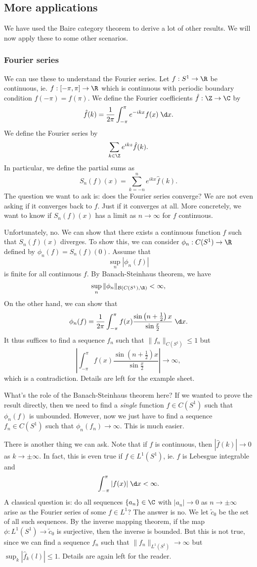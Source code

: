 \documentclass[a4paper]{article}
\begin{document}
\subsection{More applications}
We have used the Baire category theorem to derive a lot of other results. We will now apply these to some other scenarios.

\subsubsection*{Fourier series}
We can use these to understand the Fourier series. Let $f: S^1 \to \R$ be continuous, ie. $f: [-\pi, \pi] \to \R$ which is continuous with periodic boundary condition $f(-\pi) = f(\pi)$. We define the Fourier coefficients $\hat{f}: \Z \to \C$ by
\[
  \hat{f}(k) = \frac{1}{2\pi} \int_{-\pi}^\pi e^{-ikx}f(x)\;\d x.
\]
We define the Fourier series by
\[
  \sum_{k \in \Z} e^{ikz}\hat{f}(k).
\]
In particular, we define the partial sums as
\[
  S_n(f)(x) = \sum_{k = -n}^n e^{ikx}\hat{f}(k).
\]
The question we want to ask is: does the Fourier series converge? We are not even asking if it converges back to $f$. Just if it converges at all. More concretely, we want to know if $S_n(f)(x)$ has a limit as $n \to \infty$ for $f$ continuous.

Unfortunately, no. We can show that there exists a continuous function $f$ such that $S_n(f)(x)$ diverges. To show this, we can consider $\phi_n: C(S^1) \to \R$ defined by $\phi_n (f) = S_n(f)(0)$. Assume that
\[
  \sup_n |\phi_n (f)|
\]
is finite for all continuous $f$. By Banach-Steinhaus theorem, we have
\[
  \sup_n \|\phi_n\|_{\mathcal{B}(C(S^1), \R)} < \infty,
\]
On the other hand, we can show that
\[
  \phi_n(f) = \frac{1}{2\pi}\int_{-\pi}^\pi f(x)\frac{\sin\left(n + \frac{1}{2}\right)x}{\sin \frac{x}{2}} \;\d x.
\]
It thus suffices to find a sequence $f_n$ such that $\|f_n\|_{C(S^1)} \leq 1$ but
\[
  \left|\int_{-\pi}^\pi f(x)\frac{\sin\left(n + \frac{1}{2}\right)x}{\sin \frac{x}{2}}\right|\to \infty,
\]
which is a contradiction. Details are left for the example sheet.

What's the role of the Banach-Steinhaus theorem here? If we wanted to prove the result directly, then we need to find a \emph{single} function $f\in C(S^1)$ such that $\phi_n(f)$ is unbounded. However, now we just have to find a sequence $f_n \in C(S^1)$ such that $\phi_n(f_n) \to \infty$. This is much easier.

There is another thing we can ask. Note that if $f$ is continuous, then $|\hat{f}(k)| \to 0$ as $k \to \pm\infty$. In fact, this is even true if $f \in L^1(S^1)$, ie. $f$ is Lebesgue integrable and
\[
  \int_{-\pi}^\pi |f(x)| \;\d x < \infty.
\]
A classical question is: do all sequences $\{a_n\}\in \C$ with $|a_n| \to 0$ as $n \to \pm \infty$ arise as the Fourier series of some $f\in L^1$? The answer is no. We let $\tilde{c}_0$ be the set of all such sequences. By the inverse mapping theorem, if the map $\phi: L^1(S^1) \to \tilde{c}_0$ is surjective, then the inverse is bounded. But this is not true, since we can find a sequence $f_n$ such that $\|f_n\|_{L^1(S^1)} \to \infty$ but $\sup_k |\hat{f}_k(l)| \leq 1$. Details are again left for the reader.
\end{document}
